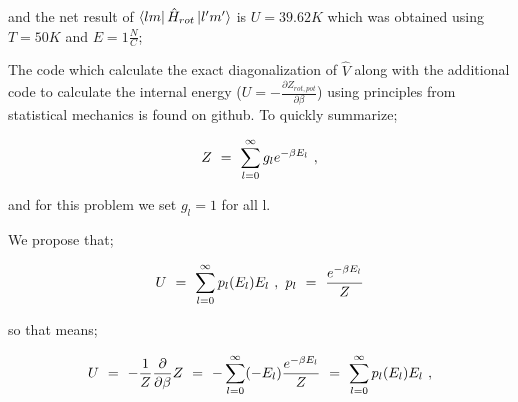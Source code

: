 \documentclass{article}
\begin{document}
and the net result of \begin{math} \bra{l m}\hat{H}_{rot}\ket{l' m'} \end{math} is \begin{math} U = 39.62 K \end{math} which was obtained using \begin{math} T = 50 K \end{math} and \begin{math} E = 1 \frac{N}{C} \end{math};

The code which calculate the exact diagonalization of \begin{math} \hat{V} \end{math} along with the additional code to calculate the internal energy (\begin{math} U  = -\frac{\partial{Z_{rot,pot}}}{\partial{\beta}} \end{math})  using principles from statistical mechanics is found on
github. To quickly summarize; 

\begin{equation} \label{rotor-eq-276-1}
Z \hspace{0.125cm} = \hspace{0.125cm} \sum_{l=0}^{\infty} g_{l} e^{-\beta E_{l}} \hspace{0.125cm} , 
\end{equation} 

and for this problem we set \begin{math} g_{l} = 1 \end{math} for all l.

We propose that;

\begin{equation} \label{rotor-eq-277-1}
U \hspace{0.125cm} = \hspace{0.125cm} \sum_{l=0}^{\infty} p_{l}(E_{l}) E_{l} \hspace{0.125cm} , \hspace{0.125cm} p_{l} \hspace{0.125cm} = \hspace{0.125cm} \frac{e^{-\beta E_{l}}}{Z}
\end{equation} 

so that means;

\begin{equation} \label{rotor-eq-278-1}
U \hspace{0.125cm} = \hspace{0.125cm} -\frac{1}{Z}\frac{\partial}{\partial{\beta}} Z \hspace{0.125cm} = \hspace{0.125cm} - \sum_{l=0}^{\infty} (-E_{l}) \frac{e^{-\beta E_{l}}}{Z}  \hspace{0.125cm} = \hspace{0.125cm} \sum_{l=0}^{\infty} p_{l}(E_{l}) E_{l} \hspace{0.125cm}, 
\end{equation} 
\end{document}
